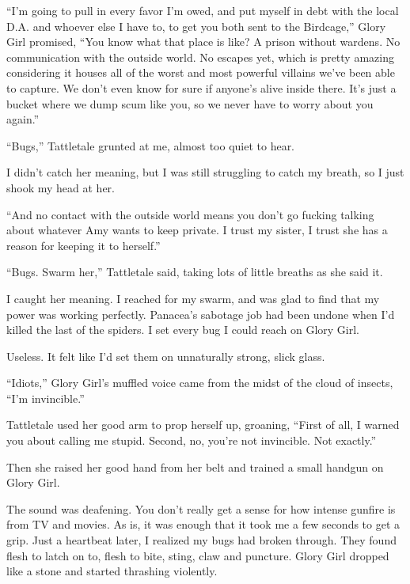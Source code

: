 ``I'm going to pull in every favor I'm owed, and put myself in debt with the local D.A. and whoever else I have to, to get you both sent to the Birdcage,'' Glory Girl promised, ``You know what that place is like?  A prison without wardens.  No communication with the outside world.  No escapes yet, which is pretty amazing considering it houses all of the worst and most powerful villains we've been able to capture.  We don't even know for sure if anyone's alive inside there.  It's just a bucket where we dump scum like you, so we never have to worry about you again.''



``Bugs,'' Tattletale grunted at me, almost too quiet to hear.



I didn't catch her meaning, but I was still struggling to catch my breath, so I just shook my head at her.



``And no contact with the outside world means you don't go fucking talking about whatever Amy wants to keep private.  I trust my sister, I trust she has a reason for keeping it to herself.''



``Bugs.  Swarm her,'' Tattletale said, taking lots of little breaths as she said it.



I caught her meaning.  I reached for my swarm, and was glad to find that my power was working perfectly.  Panacea's sabotage job had been undone when I'd killed the last of the spiders.  I set every bug I could reach on Glory Girl.



Useless.  It felt like I'd set them on unnaturally strong, slick glass.



``Idiots,'' Glory Girl's muffled voice came from the midst of the cloud of insects, ``I'm invincible.''



Tattletale used her good arm to prop herself up, groaning, ``First of all, I warned you about calling me stupid.  Second, no, you're not invincible.  Not exactly.''



Then she raised her good hand from her belt and trained a small handgun on Glory Girl.



The sound was deafening.  You don't really get a sense for how intense gunfire is from TV and movies.  As is, it was enough that it took me a few seconds to get a grip.  Just a heartbeat later, I realized my bugs had broken through.  They found flesh to latch on to, flesh to bite, sting, claw and puncture.  Glory Girl dropped like a stone and started thrashing violently.



